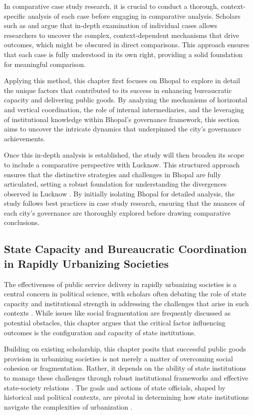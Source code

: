 In comparative case study research, it is crucial to conduct a thorough, context-specific analysis of each case before engaging in comparative analysis. Scholars such as \citet{Yin2017} and \citet{Gerring2007} argue that in-depth examination of individual cases allows researchers to uncover the complex, context-dependent mechanisms that drive outcomes, which might be obscured in direct comparisons. This approach ensures that each case is fully understood in its own right, providing a solid foundation for meaningful comparison.

Applying this method, this chapter first focuses on Bhopal to explore in detail the unique factors that contributed to its success in enhancing bureaucratic capacity and delivering public goods. By analyzing the mechanisms of horizontal and vertical coordination, the role of internal intermediaries, and the leveraging of institutional knowledge within Bhopal's governance framework, this section aims to uncover the intricate dynamics that underpinned the city's governance achievements.

Once this in-depth analysis is established, the study will then broaden its scope to include a comparative perspective with Lucknow. This structured approach ensures that the distinctive strategies and challenges in Bhopal are fully articulated, setting a robust foundation for understanding the divergences observed in Lucknow . By initially isolating Bhopal for detailed analysis, the study follows best practices in case study research, ensuring that the nuances of each city's governance are thoroughly explored before drawing comparative conclusions.

\subsection{State Capacity and Bureaucratic Coordination in Rapidly Urbanizing Societies}

The effectiveness of public service delivery in rapidly urbanizing societies is a central concern in political science, with scholars often debating the role of state capacity and institutional strength in addressing the challenges that arise in such contexts \citep{Alesina1999, Habyarimana2007}. While issues like social fragmentation are frequently discussed as potential obstacles, this chapter argues that the critical factor influencing outcomes is the configuration and capacity of state institutions.

Building on existing scholarship, this chapter posits that successful public goods provision in urbanizing societies is not merely a matter of overcoming social cohesion or fragmentation. Rather, it depends on the ability of state institutions to manage these challenges through robust institutional frameworks and effective state-society relations \citep{Heller2001}. The goals and actions of state officials, shaped by historical and political contexts, are pivotal in determining how state institutions navigate the complexities of urbanization \citep{Singh2015}.

